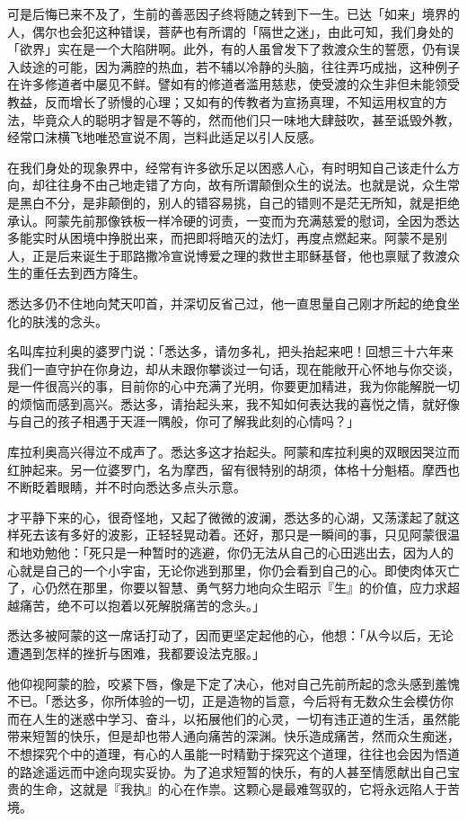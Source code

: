 \documentclass[12pt,twoside,openany]{book}
\begin{document}
可是后悔已来不及了，生前的善恶因子终将随之转到下一生。已达「如来」境界的人，偶尔也会犯这种错误，菩萨也有所谓的「隔世之迷」，由此可知，我们身处的「欲界」实在是一个大陷阱啊。此外，有的人虽曾发下了救渡众生的誓愿，仍有误入歧途的可能，因为满腔的热血，若不辅以冷静的头脑，往往弄巧成拙，这种例子在许多修道者中屡见不鲜。譬如有的修道者滥用慈悲，使受渡的众生非但未能领受教益，反而增长了骄慢的心理；又如有的传教者为宣扬真理，不知运用权宜的方法，毕竟众人的聪明才智是不等的，然而他们只一味地大肆鼓吹，甚至诋毁外教，经常口沫横飞地唯恐宣说不周，岂料此适足以引人反感。

在我们身处的现象界中，经常有许多欲乐足以困惑人心，有时明知自己该走什么方向，却往往身不由己地走错了方向，故有所谓颠倒众生的说法。也就是说，众生常是黑白不分，是非颠倒的，别人的错容易挑，自己的错则不是茫无所知，就是拒绝承认。阿蒙先前那像铁板一样冷硬的诃责，一变而为充满慈爱的慰词，全因为悉达多能实时从困境中挣脱出来，而把即将暗灭的法灯，再度点燃起来。阿蒙不是别人，正是后来诞生于耶路撒冷宣说博爱之理的救世主耶稣基督，他也禀赋了救渡众生的重任去到西方降生。

悉达多仍不住地向梵天叩首，并深切反省己过，他一直思量自己刚才所起的绝食坐化的肤浅的念头。

名叫库拉利奥的婆罗门说：「悉达多，请勿多礼，把头抬起来吧！回想三十六年来我们一直守护在你身边，却从未跟你攀谈过一句话，现在能敞开心怀地与你交谈，是一件很高兴的事，目前你的心中充满了光明，你要更加精进，我为你能解脱一切的烦恼而感到高兴。悉达多，请抬起头来，我不知如何表达我的喜悦之情，就好像与自己的孩子相遇于天涯一隅般，你可了解我此刻的心情吗？」

库拉利奥高兴得泣不成声了。悉达多这才抬起头。阿蒙和库拉利奥的双眼因哭泣而红肿起来。另一位婆罗门，名为摩西，留有很特别的胡须，体格十分魁梧。摩西也不断眨着眼睛，并不时向悉达多点头示意。

才平静下来的心，很奇怪地，又起了微微的波澜，悉达多的心湖，又荡漾起了就这样死去该有多好的波影，正轻轻晃动着。还好，那只是一瞬间的事，只见阿蒙很温和地劝勉他：「死只是一种暂时的逃避，你仍无法从自己的心田逃出去，因为人的心就是自己的一个小宇宙，无论你逃到那里，你仍会看到自己的心。即使肉体灭亡了，心仍然在那里，你要以智慧、勇气努力地向众生昭示『生』的价值，应力求超越痛苦，绝不可以抱着以死解脱痛苦的念头。」

悉达多被阿蒙的这一席话打动了，因而更坚定起他的心，他想：「从今以后，无论遭遇到怎样的挫折与困难，我都要设法克服。」

他仰视阿蒙的脸，咬紧下唇，像是下定了决心，他对自己先前所起的念头感到羞愧不已。「悉达多，你所体验的一切，正是造物的旨意，今后将有无数众生会模仿你而在人生的迷惑中学习、奋斗，以拓展他们的心灵，一切有违正道的生活，虽然能带来短暂的快乐，但是却也带人通向痛苦的深渊。快乐造成痛苦，然而众生痴迷，不想探究个中的道理，有心的人虽能一时精勤于探究这个道理，往往也会因为悟道的路途遥远而中途向现实妥协。为了追求短暂的快乐，有的人甚至情愿献出自己宝贵的生命，这就是『我执』的心在作祟。这颗心是最难驾驭的，它将永远陷人于苦境。
\end{document}
